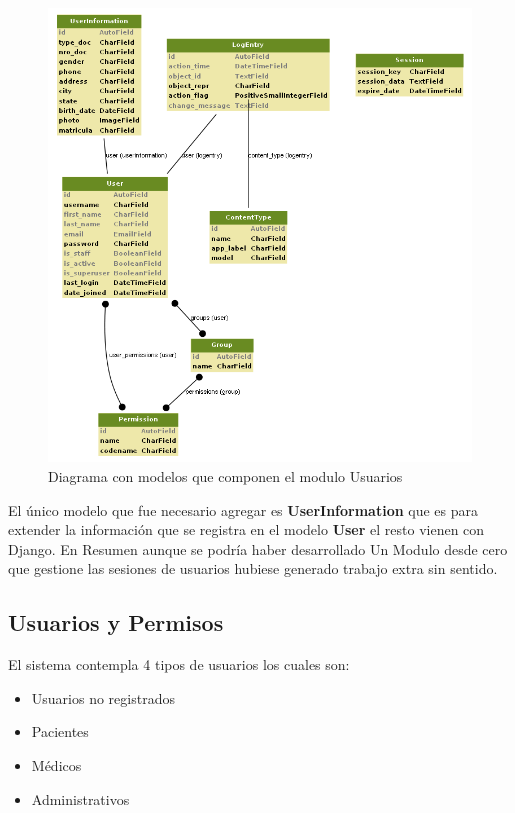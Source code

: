 \begin{figure}[H]
    \centering
    \includegraphics[scale=0.45]{resourse/auth.png}
    \caption{Diagrama con modelos que componen el modulo Usuarios}
    \label{fig:07}
\end{figure}

El único modelo que fue necesario agregar es \textbf{UserInformation} que es para extender la información que se registra en el modelo \textbf{User} el resto vienen con Django. En Resumen aunque se podría haber desarrollado Un Modulo desde cero que gestione las sesiones de usuarios hubiese generado trabajo extra sin sentido.

\subsection{Usuarios y Permisos}

El sistema contempla 4 tipos de usuarios los cuales son: 

\begin{itemize}
    \item Usuarios no registrados 
    \item Pacientes
    \item Médicos
    \item Administrativos
\end{itemize}


